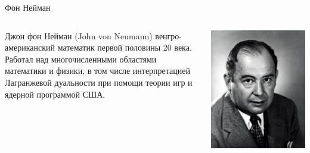 \documentclass{beamer}
\begin{document}
\begin{frame}{Фон Нейман}

\begin{columns}
\begin{column}{0.5\textwidth}
   \alert{Джон фон Нейман} (John von Neumann) венгро-американский математик первой половины 20 века. Работал над многочисленными областями математики и физики, в том числе \alert{интерпретацией Лагранжевой дуальности при помощи теории игр} и ядерной программой США.
\end{column}
\begin{column}{0.5\textwidth}  %
    \begin{center}
     \includegraphics[width=1\textwidth]{neuman.jpg}
     \end{center}
\end{column}
\end{columns}

\end{frame}
\end{document}
